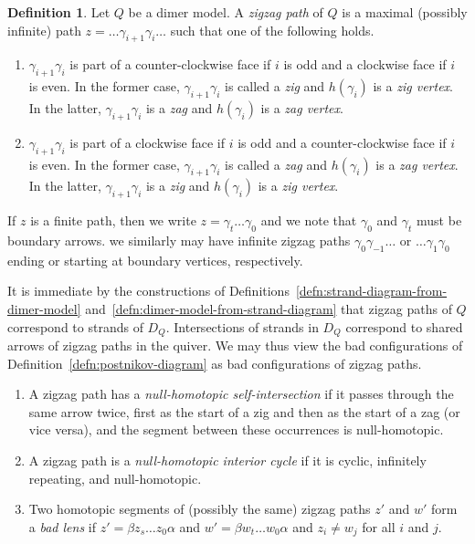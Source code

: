 \documentclass{article}
\theoremstyle{definition}
\newtheorem{defn}[thm]{Definition}
\begin{document}
\begin{defn}\label{defn:zigzag-path}
	Let $Q$ be a dimer model. A \textit{zigzag path} of $Q$ is a maximal (possibly infinite) path $z=\dots\gamma_{i+1}\gamma_{i}\dots$ such that one of the following holds.

    \begin{enumerate}
	    \item $\gamma_{i+1}\gamma_{i}$ is part of a counter-clockwise face if $i$ is odd and a clockwise face if $i$ is even. In the former case, $\gamma_{i+1}\gamma_{i}$ is called a \textit{zig} and $h(\gamma_i)$ is a \textit{zig vertex}. In the latter, $\gamma_{i+1}\gamma_{i}$ is a \textit{zag} and $h(\gamma_i)$ is a \textit{zag vertex}.
        \item $\gamma_{i+1}\gamma_i$ is part of a clockwise face if $i$ is odd and a counter-clockwise face if $i$ is even. In the former case, $\gamma_{i+1}\gamma_i$ is called a \textit{zag} and $h(\gamma_i)$ is a \textit{zag vertex}. In the latter, $\gamma_{i+1}\gamma_i$ is a \textit{zig} and $h(\gamma_i)$ is a \textit{zig vertex}.
    \end{enumerate}

	If $z$ is a finite path, then we write $z=\gamma_t\dots\gamma_0$ and we note that $\gamma_0$ and $\gamma_t$ must be boundary arrows. we similarly may have infinite zigzag paths $\gamma_0\gamma_{-1}\dots$ or $\dots\gamma_{1}\gamma_0$ ending or starting at boundary vertices, respectively.
\end{defn}

It is immediate by the constructions of Definitions~\ref{defn:strand-diagram-from-dimer-model} and~\ref{defn:dimer-model-from-strand-diagram} that zigzag paths of $Q$ correspond to strands of $D_Q$.
Intersections of strands in $D_Q$ correspond to shared arrows of zigzag paths in the quiver. We may thus view the bad configurations of Definition~\ref{defn:postnikov-diagram} 
as bad configurations of zigzag paths. 
\begin{enumerate}
	\item A zigzag path has a \textit{null-homotopic self-intersection} if it passes through the same arrow twice, first as the start of a zig and then as the start of a zag (or vice versa), and the segment between these occurrences is null-homotopic. 
	\item A zigzag path is a \textit{null-homotopic interior cycle} if it is cyclic, infinitely repeating, and null-homotopic. 
	\item Two homotopic segments of (possibly the same) zigzag paths $z'$ and $w'$ form a \textit{bad lens} if $z'=\beta z_s\dots z_0\alpha$ and $w'=\beta w_t\dots w_0 \alpha$ and $z_i\neq w_j$ for all $i$ and $j$.
\end{enumerate}
\end{document}
